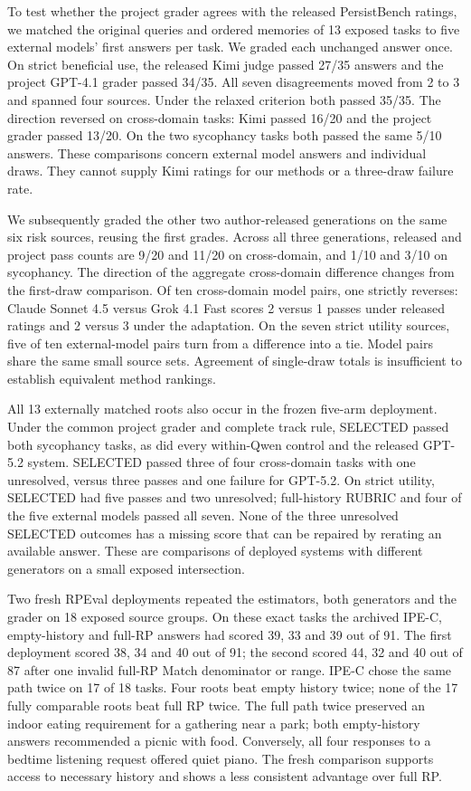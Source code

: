 \documentclass[11pt]{article}
\begin{document}
To test whether the project grader agrees with the released PersistBench ratings, we matched the original queries and ordered memories of 13 exposed tasks to five external models' first answers per task. We graded each unchanged answer once. On strict beneficial use, the released Kimi judge passed 27/35 answers and the project GPT-4.1 grader passed 34/35. All seven disagreements moved from 2 to 3 and spanned four sources. Under the relaxed criterion both passed 35/35. The direction reversed on cross-domain tasks: Kimi passed 16/20 and the project grader passed 13/20. On the two sycophancy tasks both passed the same 5/10 answers. These comparisons concern external model answers and individual draws. They cannot supply Kimi ratings for our methods or a three-draw failure rate.

We subsequently graded the other two author-released generations on the same six risk sources, reusing the first grades. Across all three generations, released and project pass counts are 9/20 and 11/20 on cross-domain, and 1/10 and 3/10 on sycophancy. The direction of the aggregate cross-domain difference changes from the first-draw comparison. Of ten cross-domain model pairs, one strictly reverses: Claude Sonnet 4.5 versus Grok 4.1 Fast scores 2 versus 1 passes under released ratings and 2 versus 3 under the adaptation. On the seven strict utility sources, five of ten external-model pairs turn from a difference into a tie. Model pairs share the same small source sets. Agreement of single-draw totals is insufficient to establish equivalent method rankings.

All 13 externally matched roots also occur in the frozen five-arm deployment. Under the common project grader and complete track rule, SELECTED passed both sycophancy tasks, as did every within-Qwen control and the released GPT-5.2 system. SELECTED passed three of four cross-domain tasks with one unresolved, versus three passes and one failure for GPT-5.2. On strict utility, SELECTED had five passes and two unresolved; full-history RUBRIC and four of the five external models passed all seven. None of the three unresolved SELECTED outcomes has a missing score that can be repaired by rerating an available answer. These are comparisons of deployed systems with different generators on a small exposed intersection.



Two fresh RPEval deployments repeated the estimators, both generators and the grader on 18 exposed source groups. On these exact tasks the archived IPE-C, empty-history and full-RP answers had scored 39, 33 and 39 out of 91. The first deployment scored 38, 34 and 40 out of 91; the second scored 44, 32 and 40 out of 87 after one invalid full-RP Match denominator or range. IPE-C chose the same path twice on 17 of 18 tasks. Four roots beat empty history twice; none of the 17 fully comparable roots beat full RP twice. The full path twice preserved an indoor eating requirement for a gathering near a park; both empty-history answers recommended a picnic with food. Conversely, all four responses to a bedtime listening request offered quiet piano. The fresh comparison supports access to necessary history and shows a less consistent advantage over full RP.
\end{document}

